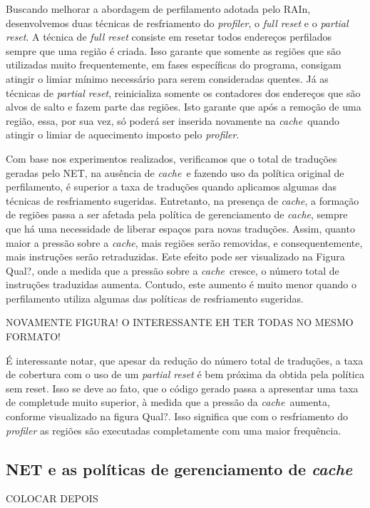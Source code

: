 \documentclass[12pt,twoside]{article}
\newcommand{\cache}{\emph{cache}}
\begin{document}
Buscando melhorar a abordagem de perfilamento adotada pelo RAIn, desenvolvemos duas técnicas de resfriamento do \emph{profiler}, o \emph{full reset} e o \emph{partial reset}. A técnica de \emph{full reset} consiste em resetar todos endereços perfilados sempre que uma região é criada. Isso garante que somente as regiões que são utilizadas muito frequentemente, em fases específicas do programa, consigam atingir o limiar mínimo necessário para serem consideradas quentes. Já as técnicas de \emph{partial reset}, reinicializa somente os contadores dos endereços que são alvos de salto e fazem parte das regiões. Isto garante que após a remoção de uma região, essa, por sua vez, só  poderá ser inserida novamente na \cache~quando atingir o limiar de aquecimento imposto pelo \emph{profiler}.

Com base nos experimentos realizados, verificamos que o total de traduções geradas pelo NET, na ausência de \cache~e fazendo uso da política original de perfilamento, é superior a taxa de traduções quando aplicamos algumas das técnicas de resfriamento sugeridas. Entretanto, na presença de \cache, a formação de regiões passa a ser afetada pela política de gerenciamento de \cache, sempre que há uma necessidade de liberar espaços para novas traduções. Assim, quanto maior a pressão sobre a \cache, mais regiões serão removidas, e consequentemente, mais instruções serão retraduzidas. Este efeito pode ser visualizado na Figura {\large Qual?}, onde a medida que a pressão sobre a \cache~cresce, o número total de instruções traduzidas aumenta. Contudo, este aumento é muito menor quando o perfilamento utiliza algumas das políticas de resfriamento sugeridas.

\begin{large}
NOVAMENTE FIGURA! O INTERESSANTE EH TER TODAS NO MESMO FORMATO!
\end{large}


É interessante notar, que apesar da redução do número total de traduções, a taxa de cobertura com o uso de um \emph{partial reset} é bem próxima da obtida pela política sem reset. Isso se deve ao fato, que o código gerado passa a apresentar uma taxa de completude muito superior, à medida que a pressão da \cache~aumenta, conforme visualizado na figura {\large Qual?}. Isso significa que com o resfriamento do \emph{profiler} as regiões são executadas completamente com uma maior frequência.



\subsection{NET e as políticas de gerenciamento de \emph{cache}}
\begin{large}
COLOCAR DEPOIS
\end{large}
\end{document}
